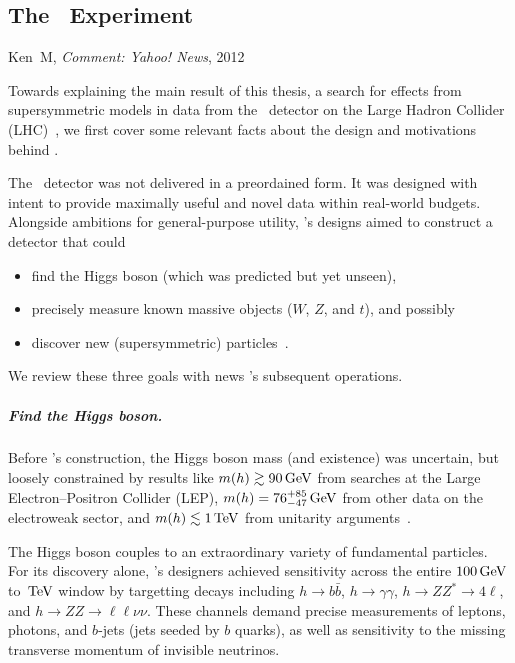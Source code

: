 \begin{singlespacing}
\chapter{The \atlas\ Experiment}
\label{chapter:experiment}
%
\begin{epigraphs}
%
{Ken~M,
\textit{Comment: Yahoo! News},
2012~\cite{kenm2012inner}}
\end{epigraphs}
\end{singlespacing}
\noindent
Towards explaining the main result of this thesis,
a search for effects from supersymmetric models
in data from the \atlas\ detector
on the Large Hadron Collider (LHC)~\cite{
atlas2022searches,
atlas2008experiment,
lhc2008machine
},
we first cover some relevant facts about the design and motivations
behind \atlas.

The \atlas\ detector was not delivered in a preordained form.
It was designed with intent to provide maximally useful and novel data within
real-world budgets.
Alongside ambitions for general-purpose utility, \atlas's designs aimed to
construct a detector that could
\begin{itemize}
\item find the Higgs boson (which was predicted but yet unseen),
\item precisely measure known massive objects ($W$, $Z$, and $t$), and possibly
\item discover new (supersymmetric) particles~\cite{atlas1999design1}.
\end{itemize}
We review these three goals with news \atlas's subsequent operations.

\paragraph{Find the Higgs boson.}
Before \atlas's construction, the Higgs boson mass (and existence) was
uncertain, but loosely constrained by results like
$m(h) \gtrsim 90\,\eV[G]$ from searches at the
Large Electron–Positron Collider (LEP),
$m(h) = 76^{+85}_{-47}\,\eV[G]$ from other data on the electroweak sector,
and $m(h) \lesssim 1\,\eV[T]$ from unitarity arguments~\cite{
atlas1999design2,
ghinculov1998perturb,
lep1999ewk
}.

The Higgs boson couples to an extraordinary variety of fundamental particles.
For its discovery alone, \atlas's designers achieved sensitivity across the
entire $100\,\eV[G]$ to $\,\eV[T]$ window by targetting decays including
$h \to b\bar b$,
$h \to \gamma\gamma$,
$h \to ZZ^* \to 4\ell$, and
$h \to ZZ \to \ell\ell\nu\nu$.
These channels demand precise measurements of leptons, photons, and
$b$-jets (jets seeded by $b$ quarks), as well as sensitivity to the missing
transverse momentum of invisible neutrinos.

